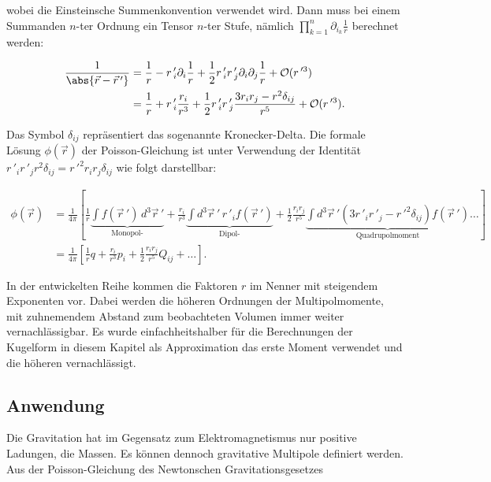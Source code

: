 \noindent
wobei die Einsteinsche Summenkonvention verwendet wird.
Dann muss bei einem Summanden \(n\)-ter Ordnung ein Tensor \(n\)-ter Stufe, nämlich \(\textstyle \prod_{k=1}^{n} \partial_{i_{k}} \frac{1}{r}\) berechnet werden:


\begin{align*}
\frac{1}{\abs{ \vec{r} - \vec{r}\,'}} &= \frac{1}{r} - r\,'_{i} \partial_{i} \frac{1}{r} + \frac{1}{2} r\,'_{i} r\,'_{j} \partial_{i} \partial_{j} \frac{1}{r} + \mathcal{O}(r\,'^{3}) \\
&= \frac{1}{r} + r\,'_{i} \frac{r_{i}}{r^{3}} + \frac{1}{2} r\,'_{i} r\,'_{j} \frac{3 r_{i} r_{j} - r^{2} \delta_{ij}}{r^{5}} + \mathcal{O}(r\,'^{3}).
\end{align*}


\noindent
Das Symbol \(\delta_{i\!j}\) repräsentiert das sogenannte Kronecker-Delta.
Die formale Lösung \(\phi (\vec{r})\) der Poisson-Gleichung ist unter Verwendung der Identität \(r\,'_{i} r\,'_{j} r^{2} \delta_{i\!j} = r\,'^{2} r_{i} r_{j} \delta_{i\!j}\) wie folgt darstellbar:


\begin{align*}
\phi (\vec{r}) &= \frac{1}{4\pi} \left[ \frac{1}{r} \underbrace{\int f (\vec{r}\,') \, d^3 \vec{r}\,'}_{\text{Monopol-}} + \frac{r_{i}}{r^{3}} \underbrace{\int d^3 \vec{r}\,' \, r\,'_{i} f (\vec{r}\,')}_{\text{Dipol-}} + \frac{1}{2} \frac{r_{i} r_{j}}{r^{5}} \underbrace{\int d^3 \vec{r}\,' \left( 3 r\,'_{i} r\,'_{j} - r\,'^{2} \delta_{i\!j} \right) f (\vec{r}\,')}_{\text{Quadrupolmoment}} \dots \right] \\
&= \frac{1}{4\pi} \left[ \frac{1}{r} q + \frac{r_{i}}{r^{3}} p_{i} + \frac{1}{2} \frac{r_{i} r_{j}}{r^{5}} Q_{i\!j} + \dots \right].
\end{align*}


In der entwickelten Reihe kommen die Faktoren \(r\) im Nenner mit steigendem Exponenten vor.
Dabei werden die höheren Ordnungen der Multipolmomente, mit zuhnemendem Abstand zum beobachteten Volumen immer weiter vernachlässigbar.
Es wurde einfachheitshalber für die Berechnungen der Kugelform in diesem Kapitel als Approximation das erste Moment verwendet und die höheren vernachlässigt.



\subsection{Anwendung
\label{planet:subsection:anwendung}}

Die Gravitation hat im Gegensatz zum Elektromagnetismus nur positive Ladungen, die Massen.
Es können dennoch gravitative Multipole definiert werden.
Aus der Poisson-Gleichung des Newtonschen Gravitationsgesetzes

